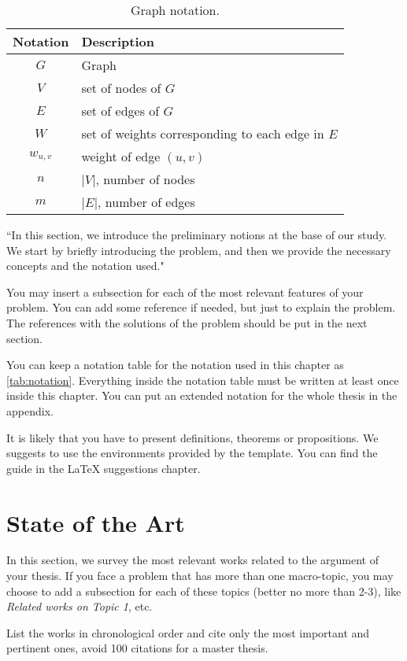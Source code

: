 \begin{table}[!ht]
\centering
\begin{tabular}{c l} \hline
\textbf{Notation}&\textbf{Description} \\ \hline
$G$&Graph\\
$V$&set of nodes of $G$\\
$E$&set of edges of $G$\\
$W$&set of weights corresponding to each edge in $E$\\
$w_{u,v}$&weight of edge $(u,v)$\\
$n$&$|V|$, number of nodes\\
$m$&$|E|$, number of edges\\
\hline
\end{tabular}
\caption{Graph notation.}
\label{tab:notation}
\end{table}

``In this section, we introduce the preliminary notions at the base of our study. We start by briefly introducing the problem, and then we provide the necessary concepts and the notation used."

You may insert a subsection for each of the most relevant features of your problem. You can add some reference if needed, but just to explain the problem. The references with the solutions of the problem should be put in the next section.

You can keep a notation table for the notation used in this chapter as \autoref{tab:notation}. Everything inside the notation table must be written at least once inside this chapter. You can put an extended notation for the whole thesis in the appendix.

It is likely that you have to present definitions, theorems or propositions. We suggests to use the environments provided by the template. You can find the guide in the LaTeX suggestions chapter.

\section{State of the Art}
\label{sec:sota}

In this section, we survey the most relevant works related to the argument of your thesis. If you face a problem that has more than one macro-topic, you may choose to add a subsection for each of these topics (better no more than 2-3), like \emph{Related works on Topic 1}, etc.

List the works in chronological order and cite only the most important and pertinent ones, avoid 100 citations for a master thesis.
\fi
